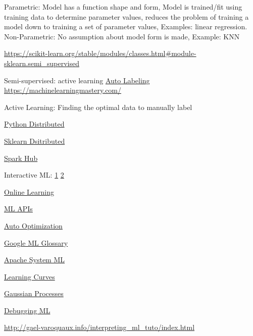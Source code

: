 \documentclass[]{book}
\begin{document}
Parametric: Model has a function shape and form, Model is trained/fit using training data to determine parameter values, reduces the problem of training a model down to training a set of parameter values, Examples: linear regression. Non-Parametric: No assumption about model form is made, Example: KNN

\url{https://scikit-learn.org/stable/modules/classes.html\#module-sklearn.semi_supervised}

Semi-supervised: active learning \href{https://blog.fastforwardlabs.com/2018/09/28/snorkel-rapid-training-data-creation-with-weak-supervision.html}{Auto Labeling} \url{https://machinelearningmastery.com/}

Active Learning: Finding the optimal data to manually label

\href{https://speakerdeck.com/seanoc/a-tour-of-large-scale-data-analysis-tools-in-python}{Python Distributed}

\href{https://alexperrier.github.io/jekyll/update/2016/03/16/out-of-core-scikit-boston-meetup.html\#/}{Sklearn Dsitributed}

\href{https://sparkhub.databricks.com/}{Spark Hub}

Interactive ML: \href{https://channel9.msdn.com/Events/useR-international-R-User-conference/useR2016/Interactive-Naive-Bayes-using-Shiny-Text-Retrieval-Classification-Quantification}{1} \href{https://nuit-blanche.blogspot.com/2017/02/saturday-morning-videos-interactive.html}{2}

\href{http://scikit-learn.org/stable/modules/generated/sklearn.linear_model.PassiveAggressiveRegressor.html}{Online Learning}

\href{http://www.kdnuggets.com/2015/12/machine-learning-data-science-apis.html}{ML APIs}

\href{https://sigopt.com/}{Auto Optimization}

\href{https://developers.google.com/machine-learning/glossary/}{Google ML Glossary}

\href{https://systemml.apache.org}{Apache System ML}

\href{http://www.ritchieng.com/machinelearning-learning-curve/}{Learning Curves}

\href{http://scikit-learn.org/stable/modules/gaussian_process.html}{Gaussian Processes}

\href{http://nlpers.blogspot.com/2016/08/debugging-machine-learning.html}{Debugging ML}

\url{http://gael-varoquaux.info/interpreting_ml_tuto/index.html}
\end{document}
